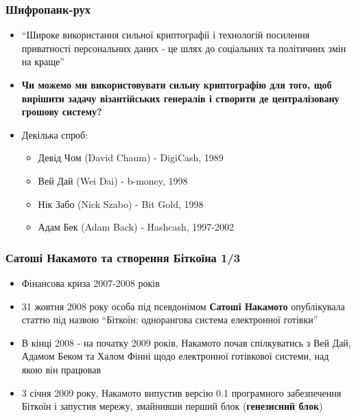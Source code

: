 \documentclass{beamer}
\begin{document}
\begin{frame}
  \frametitle{Шифропанк-рух}
  \begin{itemize}
  \item ``Широке використання сильної криптографії і технологій посилення
    приватності персональних даних - це шлях до соціальних та політичних змін на
    краще''
  \item \textbf{Чи можемо ми використовувати сильну криптографію для того, щоб
      вирішити задачу візантійських генералів і створити де централізовану
      грошову систему?}
  \item Декілька спроб:
    \begin{itemize}
    \item Девід Чом (David Chaum) - DigiCash, 1989
    \item Вей Дай (Wei Dai) - b-money, 1998
    \item Нік Забо (Nick Szabo) - Bit Gold, 1998
    \item Адам Бек (Adam Back) - Hashcash, 1997-2002
    \end{itemize}
  \end{itemize}
\end{frame}

\begin{frame}
  \frametitle{Сатоші Накамото та створення Біткоїна 1/3}
  \begin{itemize}
  \item Фінансова криза 2007-2008 років
  \item 31 жовтня 2008 року особа під псевдонімом \textbf{Сатоші Накамото}
    опублікувала статтю під назвою ``Біткоїн: однорангова система електронної готівки''
  \item В кінці 2008 - на початку 2009 років, Накамото почав спілкуватись з Вей
    Дай, Адамом Беком та Халом Фінні щодо електронної готівкової системи, над
    якою він працював
  \item 3 січня 2009 року, Накамото випустив версію 0.1 програмного забезпечення
    Біткоїн і запустив мережу, змайнивши перший блок (\textbf{генезисний блок})
  \end{itemize}
\end{frame}
\end{document}
